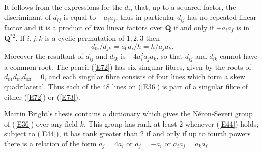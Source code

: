 \documentclass[12pt]{article}
\def\bQ{{\mathbf Q}}
\begin{document}
It follows from the expressions for the $d_{ij}$ that, up to
a squared factor, the
discriminant of $d_{ij}$ is equal to $-a_ia_j$; thus in
particular $d_{ij}$ has no repeated linear factor and it is
a product of two linear factors over $\bQ$ if and only if
$-a_ia_j$ is in $\bQ^{*2}$. If
$i,j,k$ is a cyclic permutation of $1,2,3$ then
\[ d_{0i}/d_{jk}=a_0a_i/h=h/a_ja_k. \]
Moreover the resultant of $d_{ij}$ and $d_{ik}$ is
$-4a_i^2a_ja_k$, so that $d_{ij}$ and $d_{ik}$ cannot have a
common root. The pencil (\ref{E72}) has six singular fibres,
given by the roots of $d_{01}d_{02}d_{03}=0$, and each
singular fibre consists of four lines which form a skew
quadrilateral. Thus each of the 48 lines on (\ref{E36}) is
part of a singular fibre of either (\ref{E72}) or (\ref{E73}).

Martin Bright's thesis contains a dictionary which gives the
N\'{e}ron-Severi group of (\ref{E36}) over any field $k$. This
group has rank at least 2 whenever (\ref{E44}) holds; subject
to (\ref{E44}), it has rank greater than 2 if and only if up
to
fourth powers there is a relation of the form $a_j=4a_i$ or
$a_j=-a_i$ or $a_ia_j=a_ka_\ell$.
\end{document}

